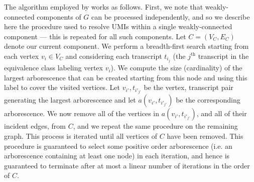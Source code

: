 The algorithm employed by \alevin works as follows.  First, we note that weakly-connected components of $G$ can be processed independently, and so we describe here the procedure used to resolve UMIs within a single weakly-connected component --- this is repeated for all such components.  Let $C = (V_C, E_C)$ denote our current component. We perform a breadth-first search starting from each vertex $v_i \in V_C$ and considering each transcript $t_{i_j}$ (the $j^{\text{th}}$ transcript in the equivalence class labeling vertex $v_i$).  We compute the size (cardinality) of the largest arborescence that can be created starting from this node and using this label to cover the visited vertices.  Let $v_{i'}, t_{i'_{j'}}$ be the vertex, transcript pair generating the largest arborescence  and let $a(v_{i'}, t_{i'_{j'}})$ be the corresponding arborescence.  We now remove all of the vertices in $a(v_{i'}, t_{i'_{j'}})$, and all of their incident edges, from $C$, and we repeat the same procedure on the remaining graph.  This process is iterated until all vertices of $C$ have been removed.  This procedure is guaranteed to select some positive order arborescence (i.e. an arborescence containing at least one node) in each iteration, and hence is guaranteed to terminate after at most a linear number of iterations in the order of $C$.

